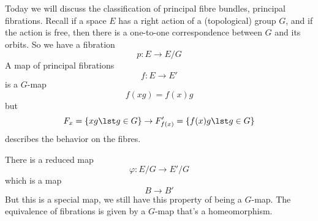 Today we will discuss the classification of principal fibre
bundles, principal fibrations. Recall if a space $E$ has a right
action of a (topological) group $G$, and if the action is free,
then there is a one-to-one correspondence between $G$ and its
orbits. So we have a fibration
\begin{equation}
p\colon E\to E/G
\end{equation}
A map of principal fibrations 
\begin{equation}
f\colon E\to E'
\end{equation}
is a $G$-map
\begin{equation}
f(xg)=f(x)g
\end{equation}
but
\begin{equation}
F_{x}=\{xg\lst g\in G\}\to F_{f(x)}'=\{f(x)g\lst g\in G\}
\end{equation}
describes the behavior on the fibres.

There is a reduced map
\begin{equation}
\varphi\colon E/G\to E'/G
\end{equation}
which is a map
\begin{equation}
B\to B'
\end{equation}
But this is a special map, we still have this property of being a
$G$-map. The equivalence of fibrations is given by a $G$-map
that's a homeomorphism.

